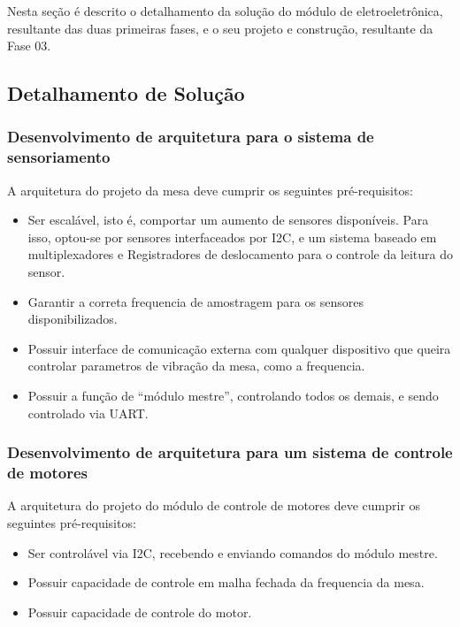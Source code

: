\label{desenvolvimento_eletroeletronica}

Nesta seção é descrito o detalhamento da solução do módulo de eletroeletrônica, resultante das duas primeiras fases,
e o seu projeto e construção, resultante da Fase 03.

\subsection{Detalhamento de Solução}

\subsubsection*{Desenvolvimento de arquitetura para o sistema de sensoriamento}

A arquitetura do projeto da mesa deve cumprir os seguintes pré-requisitos:

\begin{itemize}
    \item Ser escalável, isto é, comportar um aumento de sensores disponíveis. Para isso, optou-se por sensores interfaceados por I2C, e um sistema baseado em multiplexadores e Registradores de deslocamento para o controle da leitura do sensor.
    \item Garantir a correta frequencia de amostragem para os sensores disponibilizados.
    \item Possuir interface de comunicação externa com qualquer dispositivo que queira controlar parametros de vibração da mesa, como a frequencia.
    \item Possuir a função de “módulo mestre”, controlando todos os demais, e sendo controlado via UART.
\end{itemize}

\subsubsection*{Desenvolvimento de arquitetura para um sistema de controle de motores}

A arquitetura do projeto do módulo de controle de motores deve cumprir os seguintes pré-requisitos:

\begin{itemize}
    \item Ser  controlável via I2C, recebendo e enviando comandos do módulo mestre.
    \item Possuir capacidade de controle em malha fechada da frequencia da mesa.
    \item Possuir capacidade de controle do motor.
\end{itemize}

